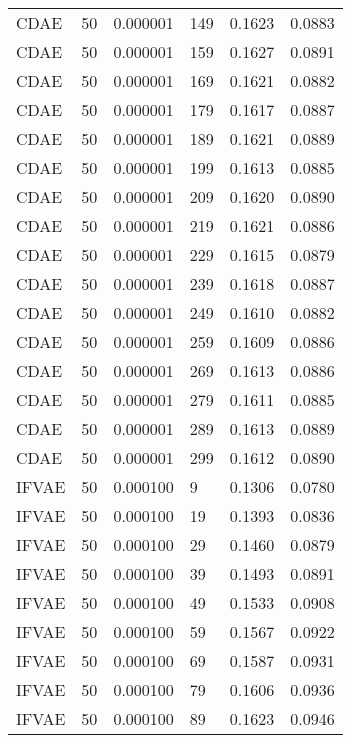 \begin{tabular}{llrlrr}
    CDAE &   50 &  0.000001 &   149 &  0.1623 &       0.0883 \\
    CDAE &   50 &  0.000001 &   159 &  0.1627 &       0.0891 \\
    CDAE &   50 &  0.000001 &   169 &  0.1621 &       0.0882 \\
    CDAE &   50 &  0.000001 &   179 &  0.1617 &       0.0887 \\
    CDAE &   50 &  0.000001 &   189 &  0.1621 &       0.0889 \\
    CDAE &   50 &  0.000001 &   199 &  0.1613 &       0.0885 \\
    CDAE &   50 &  0.000001 &   209 &  0.1620 &       0.0890 \\
    CDAE &   50 &  0.000001 &   219 &  0.1621 &       0.0886 \\
    CDAE &   50 &  0.000001 &   229 &  0.1615 &       0.0879 \\
    CDAE &   50 &  0.000001 &   239 &  0.1618 &       0.0887 \\
    CDAE &   50 &  0.000001 &   249 &  0.1610 &       0.0882 \\
    CDAE &   50 &  0.000001 &   259 &  0.1609 &       0.0886 \\
    CDAE &   50 &  0.000001 &   269 &  0.1613 &       0.0886 \\
    CDAE &   50 &  0.000001 &   279 &  0.1611 &       0.0885 \\
    CDAE &   50 &  0.000001 &   289 &  0.1613 &       0.0889 \\
    CDAE &   50 &  0.000001 &   299 &  0.1612 &       0.0890 \\
   IFVAE &   50 &  0.000100 &     9 &  0.1306 &       0.0780 \\
   IFVAE &   50 &  0.000100 &    19 &  0.1393 &       0.0836 \\
   IFVAE &   50 &  0.000100 &    29 &  0.1460 &       0.0879 \\
   IFVAE &   50 &  0.000100 &    39 &  0.1493 &       0.0891 \\
   IFVAE &   50 &  0.000100 &    49 &  0.1533 &       0.0908 \\
   IFVAE &   50 &  0.000100 &    59 &  0.1567 &       0.0922 \\
   IFVAE &   50 &  0.000100 &    69 &  0.1587 &       0.0931 \\
   IFVAE &   50 &  0.000100 &    79 &  0.1606 &       0.0936 \\
   IFVAE &   50 &  0.000100 &    89 &  0.1623 &       0.0946 \\

\end{tabular}
